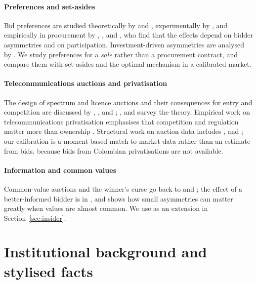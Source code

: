\documentclass[12pt,a4paper]{article}
\theoremstyle{definition}
\theoremstyle{remark}
\begin{document}
\paragraph{Preferences and set-asides} Bid preferences are studied theoretically by \citet{mcafeemcmillan1989} and \citet{laffonttirole1991}, experimentally by \citet{corns1999}, and empirically in procurement by \citet{marion2007}, \citet{krasnokutskayaseim2011}, \citet{hubbardpaarsch2009} and \citet{atheycoeylevin2013}, who find that the effects depend on bidder asymmetries and on participation. Investment-driven asymmetries are analysed by \citet{arozamenacantillon2004}. We study preferences for a \emph{sale} rather than a procurement contract, and compare them with set-asides and the optimal mechanism in a calibrated market.

\paragraph{Telecommunications auctions and privatisation} The design of spectrum and licence auctions and their consequences for entry and competition are discussed by \citet{cramton1997}, \citet{klemperer2002}, \citet{binmoreklemperer2002} and \citet{cramton2011}; \citet{klemperer1999}, \citet{krishna2010} and \citet{milgrom2004} survey the theory. Empirical work on telecommunications privatisation emphasises that competition and regulation matter more than ownership \citep{megginsonnetter2001,ros1999,wallsten2001}. Structural work on auction data includes \citet{hendricksporter1988}, \citet{guerre2000} and \citet{atheyhaile2002}; our calibration is a moment-based match to market data rather than an estimate from bids, because bids from Colombian privatisations are not available.

\paragraph{Information and common values} Common-value auctions and the winner's curse go back to \citet{wilson1977} and \citet{milgromweber1982}; the effect of a better-informed bidder is in \citet{emw1983}, and \citet{klemperer1998} shows how small asymmetries can matter greatly when values are almost common. We use \citet{emw1983} as an extension in Section~\ref{sec:insider}.

\section{Institutional background and stylised facts}\label{sec:background}
\end{document}
